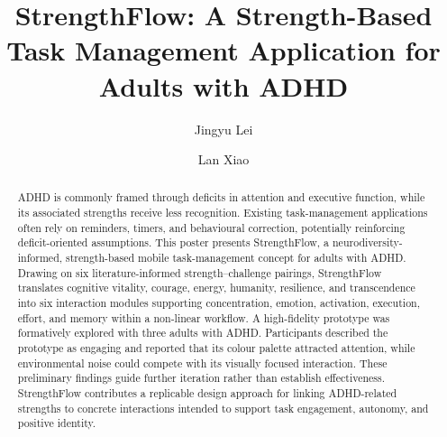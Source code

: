 \documentclass[manuscript,screen,review,anonymous]{acmart}
\begin{document}
\title[StrengthFlow: ADHD Task Management via Cognitive Strengths]{StrengthFlow: A Strength-Based Task Management Application for Adults with ADHD}

\author{Jingyu Lei}

\author{Lan Xiao}

\renewcommand{\shortauthors}{Lei}


\begin{abstract}
ADHD is commonly framed through deficits in attention and executive function,
while its associated strengths receive less recognition. Existing
task-management applications often rely on reminders, timers, and behavioural
correction, potentially reinforcing deficit-oriented assumptions. This poster
presents StrengthFlow, a neurodiversity-informed, strength-based mobile
task-management concept for adults with ADHD. Drawing on six
literature-informed strength--challenge pairings, StrengthFlow translates
cognitive vitality, courage, energy, humanity, resilience, and transcendence
into six interaction modules supporting concentration, emotion, activation,
execution, effort, and memory within a non-linear workflow. A high-fidelity
prototype was formatively explored with three adults with ADHD. Participants
described the prototype as engaging and reported that its colour palette
attracted attention, while environmental noise could compete with its visually
focused interaction. These preliminary findings guide further iteration rather
than establish effectiveness. StrengthFlow contributes a replicable design
approach for linking ADHD-related strengths to concrete interactions intended
to support task engagement, autonomy, and positive identity.
\end{abstract}



\end{document}
